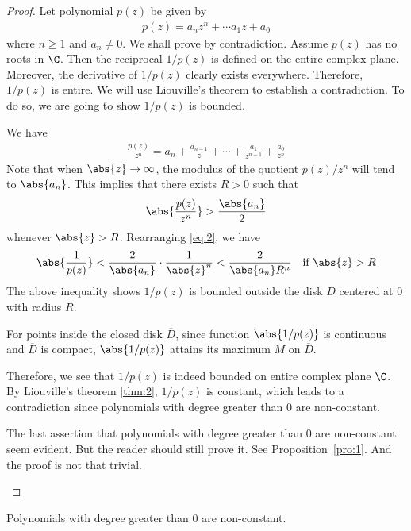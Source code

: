 \documentclass[thmcnt=section, color=cyan, 12pt]{my-elegantbook}
\begin{document}
\begin{proof}
	Let polynomial $p(z)$ be given by
	\begin{align*}
		p(z) = a_n z^n + \cdots a_1 z + a_0
	\end{align*}
	where $n \geq 1$ and $a_n \neq 0$.
	We shall prove by contradiction.
	Assume $p(z)$ has no roots in $\C$. Then the reciprocal $1 / p(z)$ is defined on the entire
	complex plane.
	Moreover, the derivative of $1 / p(z)$ clearly exists everywhere.
	Therefore, $1 / p(z)$ is entire.
	We will use Liouville's theorem to establish a contradiction.
	To do so, we are going to show $1 / p(z)$ is bounded.

	We have
	\begin{align*}
		\frac{p(z)}{z^n} = a_n + \frac{a_{n-1}}{z} + \cdots + \frac{a_1}{z^{n-1}} + \frac{a_0}{z^n}
	\end{align*}
	Note that when $\abs{z} \to \infty$, the modulus of the quotient $p(z) / z^n$ will
	tend to $\abs{a_n}$.
	This implies that there exists $R > 0$ such that
	\begin{align}
		\abs{\frac{p(z)}{z^n}} > \frac{\abs{a_n}}{2}
		\label{eq:2}
	\end{align}
	whenever $\abs{z} > R$. Rearranging \eqref{eq:2}, we have
	\begin{align*}
		\abs{\frac{1}{p(z)}} < \frac{2}{\abs{a_n}} \cdot \frac{1}{\abs{z}^n} < \frac{2}{\abs{a_n} R^n} \quad \text{if } \abs{z} > R
	\end{align*}
	The above inequality shows $1 / p(z)$ is bounded outside the disk $D$ centered
	at $0$ with radius $R$.

	For points inside the closed disk $\overline{D}$, since function $\abs{1 / p(z)}$ is
	continuous and $\overline{D}$ is compact, $\abs{1 / p(z)}$ attains its maximum $M$ on $\overline{D}$.

	Therefore, we see that $1 / p(z)$ is indeed bounded on entire complex plane $\C$.
	By Liouville's theorem \ref{thm:2}, $1 / p(z)$ is constant, which leads to a
	contradiction since polynomials with degree greater than $0$ are non-constant.


	\begin{note}
		The last assertion that polynomials with degree greater than $0$ are
		non-constant seem evident. But the reader should still prove it. See Proposition~\ref{pro:1}.
		And the proof is not that trivial.
	\end{note}
\end{proof}

\begin{proposition} \label{pro:1}
	Polynomials with degree greater than $0$ are non-constant.
\end{proposition}
\end{document}
